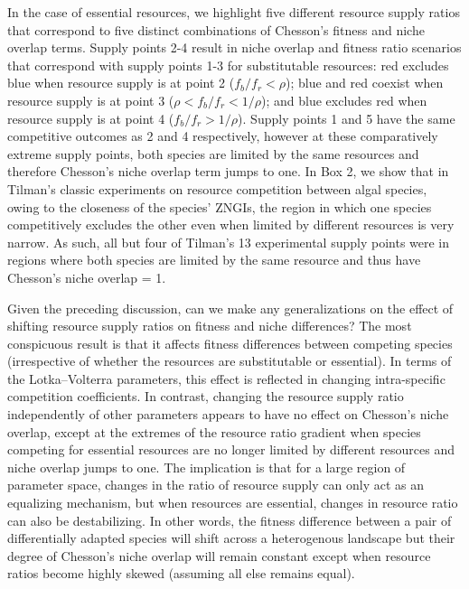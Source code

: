 In the case of essential resources, we highlight five different resource supply ratios that correspond to five distinct combinations of Chesson's fitness and niche overlap terms. Supply points 2-4 result in niche overlap and fitness ratio scenarios that correspond with supply points 1-3 for substitutable resources: red excludes blue when resource supply is at point 2 ($f_{b}/f_{r}<\rho$); blue and red coexist when resource supply is at point 3 ($\rho<f_{b}/f_{r}<1/\rho$); and blue excludes red when resource supply is at point 4 ($f_{b}/f_{r}>1/\rho$). Supply points 1 and 5 have the same competitive outcomes as 2 and 4 respectively, however at these comparatively extreme supply points, both species are limited by the same resources and therefore Chesson's niche overlap term jumps to one. In Box 2, we show that in Tilman's classic experiments on resource competition between algal species, owing to the closeness of the species' ZNGIs, the region in which one species competitively excludes the other even when limited by different resources is very narrow. As such, all but four of Tilman's 13 experimental supply points were in regions where both species are limited by the same resource and thus have Chesson's niche overlap = 1.  
\par


Given the preceding discussion, can we make any generalizations on the effect of shifting resource supply ratios on fitness and niche differences? The most conspicuous result is that it affects fitness differences between competing species (irrespective of whether the resources are substitutable or essential). In terms of the Lotka--Volterra parameters, this effect is reflected in changing intra-specific competition coefficients. In contrast, changing the resource supply ratio independently of other parameters appears to have no effect on Chesson's niche overlap, except at the extremes of the resource ratio gradient when species competing for essential resources are no longer limited by different resources and niche overlap jumps to one. The implication is that for a large region of parameter space, changes in the ratio of resource supply can only act as an equalizing mechanism, but when resources are essential, changes in resource ratio can also be destabilizing. In other words, the fitness difference between a pair of differentially adapted species will shift across a heterogenous landscape but their degree of Chesson's niche overlap will remain constant except when resource ratios become highly skewed (assuming all else remains equal).
\par


